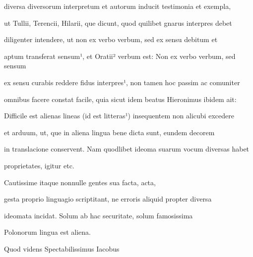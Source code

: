 diversa diversorum interpretum et autorum inducit testimonia et exempla,

ut Tullii, Terencii, Hilarii, que dicunt, quod quilibet gnarus interpres debet

\fulllines{}

diligenter intendere, ut non ex verbo verbum, sed ex sensu debitum et



aptum transferat sensum¹, et Oratii² verbum est: Non ex verbo verbum, sed sensum
%

ex sensu curabis reddere fidus interpres¹, non tamen hoc passim ac comuniter

omnibus facere constat facile, quia sicut idem beatus Hieronimus ibidem ait:

Difficile est alienas lineas (id est litteras¹) insequentem non alicubi excedere

et arduum, ut, que in aliena lingua bene dicta sunt, eundem decorem

in translacione conservent. Nam quodlibet ideoma suarum vocum diversas habet

\splitlines{}

proprietates, igitur etc.

\indentK Cautissime itaque nonnulle gentes sua facta, acta,

\fulllines{}

gesta proprio linguagio scriptitant, ne erroris aliquid propter diversa

ideomata incidat. Solum ab hac securitate, solum famosissima

\splitlines{}

Polonorum lingua est aliena.

\indentK Quod videns Spectabilissimus Iacobus

